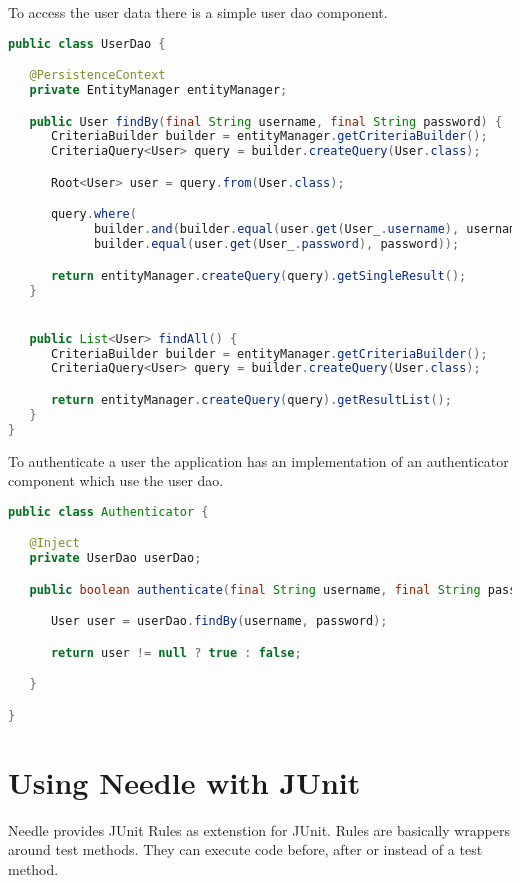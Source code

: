 \parskip 14pt
\parindent 0pt
To access the user data there is a simple user dao component.

\begin{lstlisting}[language={JAVA},caption=The user dao component]
public class UserDao {

   @PersistenceContext
   private EntityManager entityManager;

   public User findBy(final String username, final String password) {
      CriteriaBuilder builder = entityManager.getCriteriaBuilder();
      CriteriaQuery<User> query = builder.createQuery(User.class);

      Root<User> user = query.from(User.class);

      query.where(
            builder.and(builder.equal(user.get(User_.username), username)),
            builder.equal(user.get(User_.password), password));

      return entityManager.createQuery(query).getSingleResult();
   }


   public List<User> findAll() {
      CriteriaBuilder builder = entityManager.getCriteriaBuilder();
      CriteriaQuery<User> query = builder.createQuery(User.class);

      return entityManager.createQuery(query).getResultList();
   }
}
\end{lstlisting}

\parskip 14pt
\parindent 0pt
To authenticate a user the application has an implementation of an authenticator component which use the user dao.

\begin{lstlisting}[language={JAVA},caption=The authenticator component]
public class Authenticator {

   @Inject
   private UserDao userDao;

   public boolean authenticate(final String username, final String password) {

      User user = userDao.findBy(username, password);

      return user != null ? true : false;

   }

}
\end{lstlisting}

\section{Using Needle with JUnit}
\label{sec: JUnit}

Needle provides JUnit Rules as extenstion for JUnit. Rules are basically wrappers around test methods. They can execute code before, after or instead of a test method.

